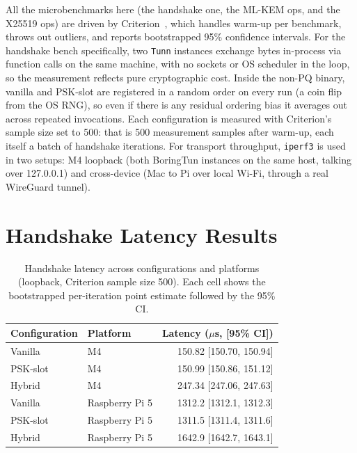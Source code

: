 All the microbenchmarks here (the handshake one, the ML-KEM ops, and the X25519 ops) are driven by Criterion~\cite{criterion}, which handles warm-up per benchmark, throws out outliers, and reports bootstrapped 95\% confidence intervals. For the handshake bench specifically, two \texttt{Tunn} instances exchange bytes in-process via function calls on the same machine, with no sockets or OS scheduler in the loop, so the measurement reflects pure cryptographic cost. Inside the non-PQ binary, vanilla and PSK-slot are registered in a random order on every run (a coin flip from the OS RNG), so even if there is any residual ordering bias it averages out across repeated invocations. Each configuration is measured with Criterion's sample size set to 500: that is 500 measurement samples after warm-up, each itself a batch of handshake iterations. For transport throughput, \texttt{iperf3} is used in two setups: M4 loopback (both BoringTun instances on the same host, talking over 127.0.0.1) and cross-device (Mac to Pi over local Wi-Fi, through a real WireGuard tunnel).

\section{Handshake Latency Results}
\label{sec:handshake_latency_results}

\begin{table}[H]
\centering
\caption{Handshake latency across configurations and platforms (loopback, Criterion sample size 500). Each cell shows the bootstrapped per-iteration point estimate followed by the 95\% CI.}
\label{tab:handshake_latency}
\begin{tabular}{@{}llr@{}}
\toprule
\textbf{Configuration} & \textbf{Platform} & \textbf{Latency ($\mu$s, [95\% CI])} \\
\midrule
Vanilla   & M4              & 150.82 [150.70, 150.94] \\
PSK-slot  & M4              & 150.99 [150.86, 151.12] \\
Hybrid    & M4              & 247.34 [247.06, 247.63] \\
\midrule
Vanilla   & Raspberry Pi 5  & 1312.2 [1312.1, 1312.3] \\
PSK-slot  & Raspberry Pi 5  & 1311.5 [1311.4, 1311.6] \\
Hybrid    & Raspberry Pi 5  & 1642.9 [1642.7, 1643.1] \\
\bottomrule
\end{tabular}
\end{table}

